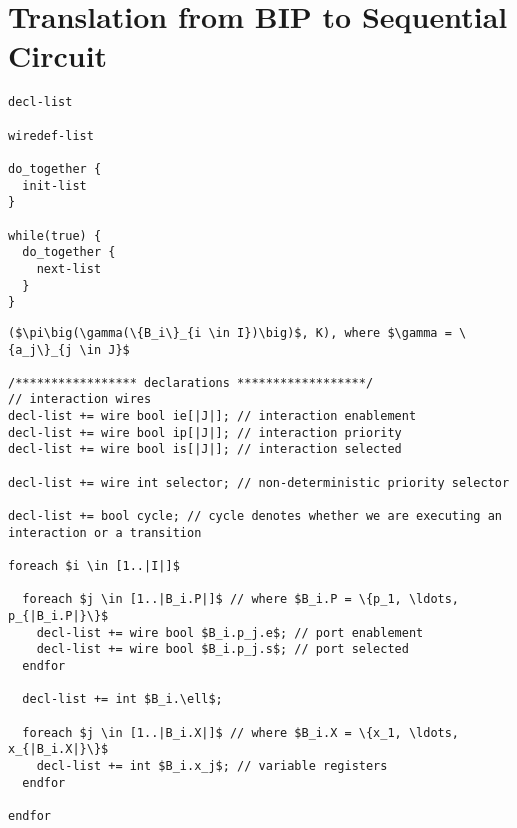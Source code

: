 \section{Translation from BIP to Sequential Circuit}
\label{sect-translation}



\begin{lstlisting}
decl-list

wiredef-list

do_together {
  init-list
}

while(true) {
  do_together {
    next-list
  }
}
\end{lstlisting}

\begin{lstlisting}
($\pi\big(\gamma(\{B_i\}_{i \in I})\big)$, K), where $\gamma = \{a_j\}_{j \in J}$

/***************** declarations ******************/
// interaction wires
decl-list += wire bool ie[|J|]; // interaction enablement 
decl-list += wire bool ip[|J|]; // interaction priority
decl-list += wire bool is[|J|]; // interaction selected

decl-list += wire int selector; // non-deterministic priority selector

decl-list += bool cycle; // cycle denotes whether we are executing an interaction or a transition 

foreach $i \in [1..|I|]$

  foreach $j \in [1..|B_i.P|]$ // where $B_i.P = \{p_1, \ldots, p_{|B_i.P|}\}$ 
    decl-list += wire bool $B_i.p_j.e$; // port enablement
    decl-list += wire bool $B_i.p_j.s$; // port selected
  endfor 
  
  decl-list += int $B_i.\ell$;
  
  foreach $j \in [1..|B_i.X|]$ // where $B_i.X = \{x_1, \ldots, x_{|B_i.X|}\}$  
    decl-list += int $B_i.x_j$; // variable registers
  endfor
   
endfor
\end{lstlisting}

\iffalse
\begin{lstlisting}
  BIP2$\this$($\pi\big(\gamma(\{B_1, \ldots, B_n\})\big)$, K)
  Let bW, bR, bPI be the set of Boolean wire, register and primary input variables, respectively.
  Let W, R, PI be the set of integer wire, register and primary input variables, respectively.
  Let wiredef, init, next be empty lists of statements. 

  foreach component $B \in \{B_1, \ldots, B_n\}$
    R += $B_i\_{\ell}$ // location register variable
    foreach variable $x$ in $B_i.X$
      R +=  $B_i$_x
    foreach port $p$ in $B_i.P$ 
      bW += $\{ B_i\_p\_\mathit{enable}, B_i\_p\_\mathit{selected}\}$

  foreach interaction  $a_i \in \gamma$
    $a\_enable[i] = G_{a_i} \wedge \bigwedge_{p\in P_{a_i}\wedge p=B_i.p } B_i.p\_selected  $ 
    $a\_execute[i] = $
    $a\_piority[i] = $
\end{lstlisting}
\fi

